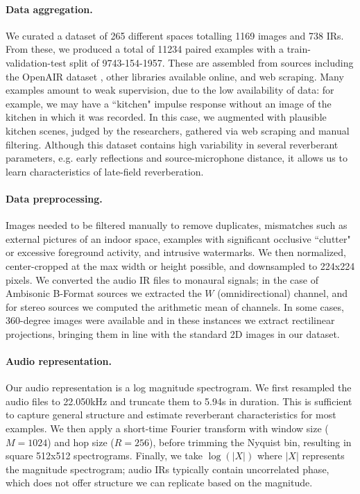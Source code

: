 \documentclass[10pt,twocolumn,letterpaper]{article}
\begin{document}
\paragraph{Data aggregation.}
We curated a dataset of 265 different spaces totalling 1169 images and 738 IRs. From these, we produced a total of 11234 paired examples with a train-validation-test split of 9743-154-1957. These are assembled from sources including the OpenAIR dataset \cite{murphy2010openair}, other libraries available online, and web scraping. Many examples amount to weak supervision, due to the low availability of data: for example, we may have a ``kitchen" impulse response without an image of the kitchen in which it was recorded. In this case, we augmented with plausible kitchen scenes, judged by the researchers, gathered via web scraping and manual filtering. Although this dataset contains high variability in several reverberant parameters, e.g. early reflections and source-microphone distance, it allows us to learn characteristics of late-field reverberation.

\paragraph{Data preprocessing.}
Images needed to be filtered manually to remove duplicates, mismatches such as external pictures of an indoor space, examples with significant occlusive ``clutter" or excessive foreground activity, and intrusive watermarks. We then normalized, center-cropped at the max width or height possible, and downsampled to 224x224 pixels. We converted the audio IR files to monaural signals; in the case of Ambisonic B-Format sources we extracted the $W$ (omnidirectional) channel, and for stereo sources we computed the arithmetic mean of channels. In some cases, 360-degree images were available and in these instances we extract rectilinear projections, bringing them in line with the standard 2D images in our dataset.

\paragraph{Audio representation.}
Our audio representation is a log magnitude spectrogram. We first resampled the audio files to 22.050kHz and truncate them to 5.94s in duration. This is sufficient to capture general structure and estimate reverberant characteristics for most examples. We then apply a short-time Fourier transform with window size ($M=1024$) and hop size ($R=256$), before trimming the Nyquist bin, resulting in square 512x512 spectrograms. Finally, we take $\log(\lvert X \rvert)$ where $\lvert X \rvert$ represents the magnitude spectrogram; audio IRs typically contain uncorrelated phase, which does not offer structure we can replicate based on the magnitude.
\end{document}

